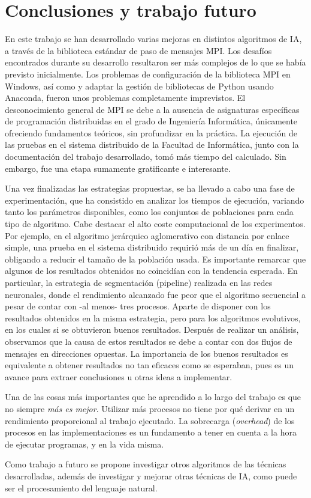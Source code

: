 \chapter{Conclusiones y trabajo futuro}
\label{cap:c5_conclu}

	En este trabajo se han desarrollado varias mejoras en distintos algoritmos de IA, a través de la biblioteca estándar de paso de mensajes MPI. Los desafíos encontrados durante su desarrollo resultaron ser más complejos de lo que se había previsto inicialmente. Los problemas de configuración de la biblioteca MPI en Windows, así como y adaptar la gestión de bibliotecas de Python usando Anaconda, fueron unos problemas completamente imprevistos. El desconocimiento general de  MPI se debe a la ausencia de asignaturas específicas de programación distribuidas en el grado de Ingeniería Informática, únicamente ofreciendo fundamentos teóricos, sin profundizar en la práctica. La ejecución de las pruebas en el sistema distribuido de la Facultad de Informática, junto con la documentación del trabajo desarrollado, tomó más tiempo del calculado. Sin embargo, fue una etapa sumamente gratificante e interesante. 
	
		
	Una vez finalizadas las estrategias propuestas, se ha llevado a cabo una fase de experimentación, que ha consistido en analizar los tiempos de ejecución, variando tanto los parámetros disponibles, como los conjuntos de poblaciones para cada tipo de algoritmo. Cabe destacar el alto coste computacional de los experimentos. Por ejemplo, en el algoritmo jerárquico aglomerativo con distancia por enlace simple, una prueba en el sistema  distribuido requirió más de un día en finalizar, obligando a reducir el tamaño de la población usada. Es importante remarcar que algunos de los resultados obtenidos no coincidían con la tendencia esperada. En particular, la estrategia de segmentación (pipeline) realizada en las redes neuronales, donde el rendimiento alcanzado fue peor que el algoritmo secuencial a pesar de contar con -al menos- tres procesos. Aparte de disponer con los resultados obtenidos en la misma estrategia, pero para los algoritmos evolutivos, en los cuales si se obtuvieron buenos resultados. Después de realizar un análisis, observamos que la causa de estos resultados se debe a contar con dos flujos de mensajes en direcciones opuestas. La importancia de los buenos resultados es equivalente a obtener resultados no tan eficaces como se esperaban, pues es un avance para extraer conclusiones u otras ideas a implementar.
	

	Una de las cosas más importantes que he aprendido a lo largo del trabajo es que no siempre \textit{más es mejor}. Utilizar más procesos no tiene por qué derivar en un rendimiento proporcional al trabajo ejecutado. La sobrecarga (\textit{overhead}) de los procesos en las implementaciones es un fundamento a tener en cuenta a la hora de ejecutar programas, y en la vida misma.	
	
	
	Como trabajo a futuro se propone investigar otros algoritmos de las técnicas desarrolladas, además de investigar y mejorar otras técnicas de IA, como puede ser el procesamiento del lenguaje natural.
	
	
	
	
	